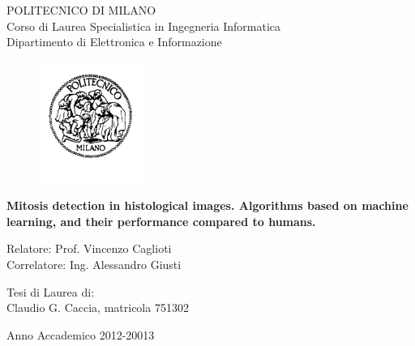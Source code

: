 \thispagestyle{empty}
\vspace*{-1.5cm}
\bfseries{
	\begin{center}
		\large
		POLITECNICO DI MILANO\\
		\normalsize
		Corso di Laurea Specialistica in Ingegneria Informatica\\
		Dipartimento di Elettronica e Informazione\\
		\begin{figure}[htbp]
			\begin{center}
				\includegraphics[width=3.5cm]{./images/logopm}
			\end{center}
		\end{figure}
		
		\vspace*{0.5cm} \LARGE
		
		\textbf{Mitosis detection in histological images.  Algorithms based on machine learning, and their performance compared to humans.}\\
		
		\vspace*{.5truecm} \large
		
	\end{center}
	
	\vspace*{2.0cm} \large
	
	\begin{flushleft}
		Relatore: Prof. Vincenzo Caglioti \\
		Correlatore: Ing. Alessandro Giusti
	\end{flushleft}
	
	\vspace*{1.25cm}
	
	\begin{flushright}
		Tesi di Laurea di:\\ Claudio G. Caccia, matricola 751302 \\
	\end{flushright}
	
	\vspace*{2.0cm}
	
	\begin{center}
		Anno Accademico 2012-20013
	\end{center} \clearpage
}
